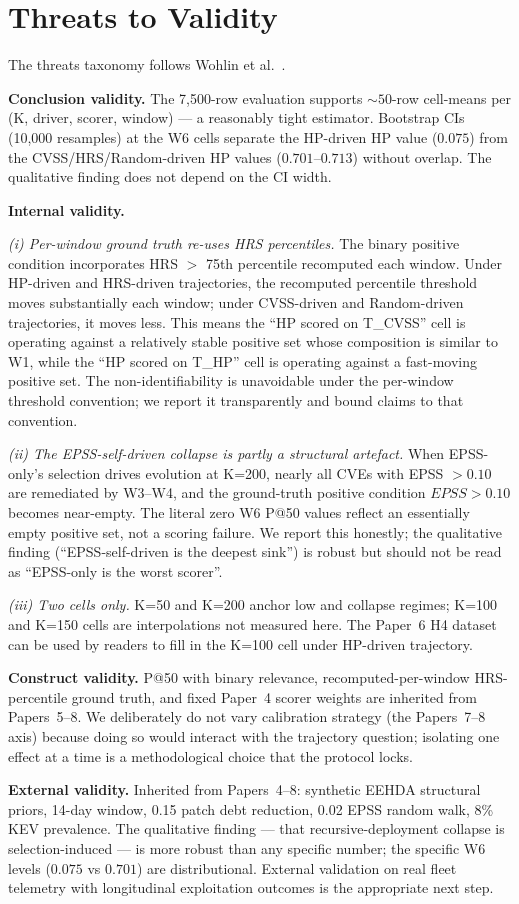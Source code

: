 \section{Threats to Validity}
\label{sec:threats}

The threats taxonomy follows Wohlin et al.~\cite{wohlin2012experimentation}.

\textbf{Conclusion validity.} The 7{,}500-row evaluation supports
$\sim 50$-row cell-means per (K, driver, scorer, window) --- a
reasonably tight estimator. Bootstrap CIs (10{,}000 resamples) at
the W6 cells separate the HP-driven HP value ($0.075$) from the
CVSS/HRS/Random-driven HP values ($0.701$--$0.713$) without overlap.
The qualitative finding does not depend on the CI width.

\textbf{Internal validity.}

\textit{(i) Per-window ground truth re-uses HRS percentiles.} The
binary positive condition incorporates HRS $>$ 75th percentile
recomputed each window. Under HP-driven and HRS-driven trajectories,
the recomputed percentile threshold moves substantially each window;
under CVSS-driven and Random-driven trajectories, it moves less.
This means the ``HP scored on T\_CVSS'' cell is operating against a
relatively stable positive set whose composition is similar to W1,
while the ``HP scored on T\_HP'' cell is operating against a
fast-moving positive set. The non-identifiability is unavoidable
under the per-window threshold convention; we report it transparently
and bound claims to that convention.

\textit{(ii) The EPSS-self-driven collapse is partly a structural
artefact.} When EPSS-only's selection drives evolution at K=200,
nearly all CVEs with EPSS $> 0.10$ are remediated by W3--W4, and the
ground-truth positive condition $EPSS > 0.10$ becomes near-empty.
The literal zero W6 P@50 values reflect an essentially empty positive
set, not a scoring failure. We report this honestly; the qualitative
finding (``EPSS-self-driven is the deepest sink'') is robust but
should not be read as ``EPSS-only is the worst scorer''.

\textit{(iii) Two cells only.} K=50 and K=200 anchor low and
collapse regimes; K=100 and K=150 cells are interpolations not
measured here. The Paper~6 H4 dataset can be used by readers to
fill in the K=100 cell under HP-driven trajectory.

\textbf{Construct validity.} P@50 with binary relevance, recomputed-per-window
HRS-percentile ground truth, and fixed Paper~4 scorer weights are
inherited from Papers~5--8. We deliberately do not vary calibration
strategy (the Papers~7--8 axis) because doing so would interact with
the trajectory question; isolating one effect at a time is a
methodological choice that the protocol locks.

\textbf{External validity.} Inherited from Papers~4--8: synthetic
EEHDA structural priors, 14-day window, 0.15 patch debt reduction,
0.02 EPSS random walk, 8\% KEV prevalence. The qualitative finding ---
that recursive-deployment collapse is selection-induced --- is more
robust than any specific number; the specific W6 levels ($0.075$ vs
$0.701$) are distributional. External validation on real fleet
telemetry with longitudinal exploitation outcomes is the appropriate
next step.
